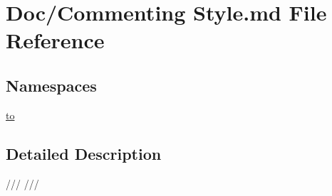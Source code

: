 \hypertarget{Commenting_01Style_8md}{}\section{Doc/\+Commenting Style.\+md File Reference}
\label{Commenting_01Style_8md}
\subsection*{Namespaces}
\begin{DoxyCompactItemize}
\item 
 \hyperlink{namespaceto}{to}
\end{DoxyCompactItemize}


\subsection{Detailed Description}
/// /// 